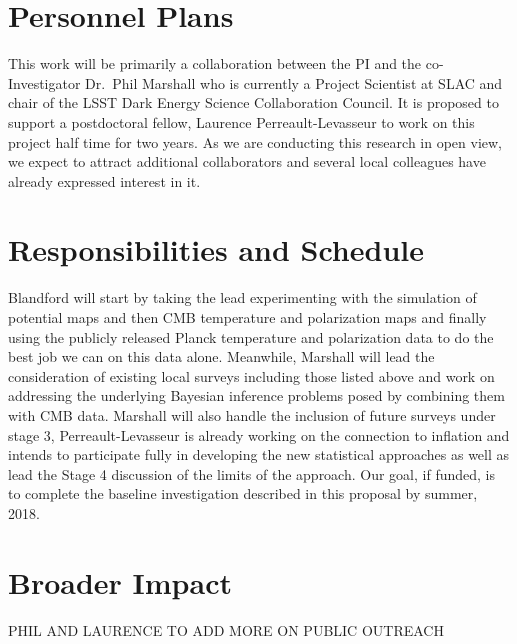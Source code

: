 \documentclass[psfig,11pt]{article}
\begin{document}

\section{Personnel Plans}

This work will be primarily a collaboration between the PI and the co-Investigator Dr.\ Phil Marshall who is currently a Project Scientist at SLAC and chair of the LSST Dark Energy Science Collaboration Council. It is proposed to support a postdoctoral fellow, Laurence Perreault-Levasseur to work on this project half time for two years. As we are conducting this research in open view, we expect to attract additional collaborators and several local colleagues have already expressed interest in it.


\section{Responsibilities and Schedule}

Blandford will start by taking the lead experimenting with the simulation of potential maps and then CMB temperature and polarization maps and finally using the publicly released Planck temperature and polarization data to do the best job we can on this data alone. Meanwhile, Marshall will lead the consideration of existing local surveys including those listed above and work on addressing the underlying Bayesian inference problems posed by combining them with CMB data. Marshall will also handle the inclusion of future surveys under stage 3, Perreault-Levasseur is already working on the connection to inflation and intends to participate fully in developing the new statistical approaches as well as lead the Stage 4 discussion of the limits of the approach. Our goal, if funded, is to complete the baseline investigation described in this proposal by summer, 2018.

\section{Broader Impact}

PHIL  AND LAURENCE TO ADD MORE ON PUBLIC OUTREACH
\end{document}
